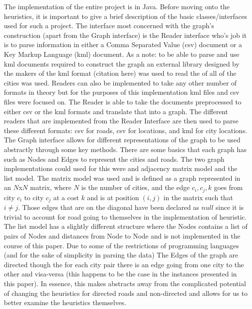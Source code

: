 \documentclass[midd]{thesis}
\newcommand{\tab}{\hspace*{2em}}
\begin{document}
\tab The implementation of the entire project is in Java. Before moving onto the heuristics, it is important to give a brief description of the basic classes/interfaces used for such a project. The interface most concerned with the graph's construction (apart from the Graph interface) is the Reader interface who's job it is to parse information in either a Comma Separated Value (csv) document or a Key Markup Language (kml) document. As a note: to be able to parse and use kml documents required to construct the graph an external library designed by the makers of the kml format (citation here) was used to read the of all of the cities was used. Readers can also be implemented to take any other number of formats in theory but for the purposes of this implementation kml files and csv files were focused on. The Reader is able to take the documents preprocessed to either csv or the kml formats and translate that into a graph. The different readers that are implemented from the Reader Interface are then used to parse these different formats: csv for roads, csv for locations, and kml for city locations.\\
\tab The Graph interface allows for different representations of the graph to be used abstractly through some key methods. There are some basics that each graph has such as Nodes and Edges to represent the cities and roads. The two graph implementations could used for this were and adjacency matrix model and the list model. The matrix model was used and is defined as a graph represented in an $N$x$N$ matrix, where $N$ is the number of cities, and the edge $c_i,c_j,k$ goes from city $c_i$ to city $c_j$ at a cost $k$ and is at position $(i,j)$ in the matrix such that $i \neq j$. Those edges that are on the diagonal have been declared as $null$ since it is trivial to account for road going to themselves in the implementation of heuristic. The list model has a slightly different structure where the Nodes contains a list of pairs of Nodes and distances from Node to Node and is not implemented in the course of this paper. Due to some of the restrictions of programming languages (and for the sake of simplicity in parsing the data) The Edges of the graph are directed though the for each city pair there is an edge going from one city to the other and visa-versa (this happens to be the case in the instances presented in this paper). In essence, this makes abstracts away from the complicated potential of changing the heuristics for directed roads and non-directed and allows for us to better examine the heuristics themselves.\\
\end{document}
